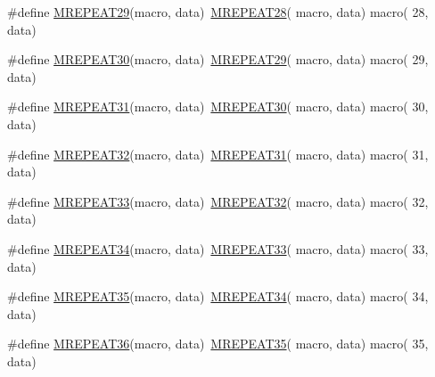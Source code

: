 \begin{DoxyCompactItemize}
\item 
\#define \mbox{\hyperlink{group__group__sam0__utils__mrepeat_ga45db5721fbef0548ff66d27c2d7c4393}{M\+R\+E\+P\+E\+A\+T29}}(macro,  data)~\mbox{\hyperlink{group__group__sam0__utils__mrepeat_gab45193969a834715c8a19fc7c2d4a173}{M\+R\+E\+P\+E\+A\+T28}}( macro, data)   macro( 28, data)
\item 
\#define \mbox{\hyperlink{group__group__sam0__utils__mrepeat_ga7b2a77fc380778a167d44b347ac338a8}{M\+R\+E\+P\+E\+A\+T30}}(macro,  data)~\mbox{\hyperlink{group__group__sam0__utils__mrepeat_ga45db5721fbef0548ff66d27c2d7c4393}{M\+R\+E\+P\+E\+A\+T29}}( macro, data)   macro( 29, data)
\item 
\#define \mbox{\hyperlink{group__group__sam0__utils__mrepeat_ga8716e59c066fbf28d4a05a2df9ce1e7e}{M\+R\+E\+P\+E\+A\+T31}}(macro,  data)~\mbox{\hyperlink{group__group__sam0__utils__mrepeat_ga7b2a77fc380778a167d44b347ac338a8}{M\+R\+E\+P\+E\+A\+T30}}( macro, data)   macro( 30, data)
\item 
\#define \mbox{\hyperlink{group__group__sam0__utils__mrepeat_ga36c6234214aab94448eb8c65ecdc2f08}{M\+R\+E\+P\+E\+A\+T32}}(macro,  data)~\mbox{\hyperlink{group__group__sam0__utils__mrepeat_ga8716e59c066fbf28d4a05a2df9ce1e7e}{M\+R\+E\+P\+E\+A\+T31}}( macro, data)   macro( 31, data)
\item 
\#define \mbox{\hyperlink{group__group__sam0__utils__mrepeat_ga36d12737d2ee8e77fbdef2f18c697164}{M\+R\+E\+P\+E\+A\+T33}}(macro,  data)~\mbox{\hyperlink{group__group__sam0__utils__mrepeat_ga36c6234214aab94448eb8c65ecdc2f08}{M\+R\+E\+P\+E\+A\+T32}}( macro, data)   macro( 32, data)
\item 
\#define \mbox{\hyperlink{group__group__sam0__utils__mrepeat_gad9540e7ec7a97aade78bdbfb0fbc1649}{M\+R\+E\+P\+E\+A\+T34}}(macro,  data)~\mbox{\hyperlink{group__group__sam0__utils__mrepeat_ga36d12737d2ee8e77fbdef2f18c697164}{M\+R\+E\+P\+E\+A\+T33}}( macro, data)   macro( 33, data)
\item 
\#define \mbox{\hyperlink{group__group__sam0__utils__mrepeat_ga20ad71ff8aba1011aa0cb4cf86669f73}{M\+R\+E\+P\+E\+A\+T35}}(macro,  data)~\mbox{\hyperlink{group__group__sam0__utils__mrepeat_gad9540e7ec7a97aade78bdbfb0fbc1649}{M\+R\+E\+P\+E\+A\+T34}}( macro, data)   macro( 34, data)
\item 
\#define \mbox{\hyperlink{group__group__sam0__utils__mrepeat_gad01671ded2811e1cabe5d5642ebb4987}{M\+R\+E\+P\+E\+A\+T36}}(macro,  data)~\mbox{\hyperlink{group__group__sam0__utils__mrepeat_ga20ad71ff8aba1011aa0cb4cf86669f73}{M\+R\+E\+P\+E\+A\+T35}}( macro, data)   macro( 35, data)

\end{DoxyCompactItemize}
